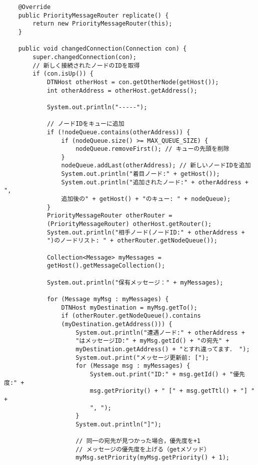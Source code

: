 \documentclass[11pt]{icsthesis}
\begin{document}
\begin{framed}
\begin{verbatim}
    @Override
    public PriorityMessageRouter replicate() {
        return new PriorityMessageRouter(this);
    }

    public void changedConnection(Connection con) {
        super.changedConnection(con);
        // 新しく接続されたノードのIDを取得
        if (con.isUp()) {
            DTNHost otherHost = con.getOtherNode(getHost());
            int otherAddress = otherHost.getAddress();
            
            System.out.println("-----");
            
            // ノードIDをキューに追加
            if (!nodeQueue.contains(otherAddress)) {
                if (nodeQueue.size() >= MAX_QUEUE_SIZE) {
                    nodeQueue.removeFirst(); // キューの先頭を削除
                }
                nodeQueue.addLast(otherAddress); // 新しいノードIDを追加
                System.out.println("着目ノード:" + getHost());
                System.out.println("追加されたノード:" + otherAddress + ", 
                追加後の" + getHost() + "のキュー: " + nodeQueue);
            }
            PriorityMessageRouter otherRouter = 
            (PriorityMessageRouter) otherHost.getRouter();
            System.out.println("相手ノード(ノードID:" + otherAddress + 
            ")のノードリスト: " + otherRouter.getNodeQueue());
      
            Collection<Message> myMessages = 
            getHost().getMessageCollection();
            
            System.out.println("保有メッセージ：" + myMessages);

            for (Message myMsg : myMessages) {
                DTNHost myDestination = myMsg.getTo();
                if (otherRouter.getNodeQueue().contains
                (myDestination.getAddress())) {
                    System.out.println("遭遇ノード:" + otherAddress + 
                    "はメッセージID:" + myMsg.getId() + "の宛先" + 
                    myDestination.getAddress() + "とすれ違ってます． ");
                    System.out.print("メッセージ更新前: [");
                    for (Message msg : myMessages) {
                        System.out.print("ID:" + msg.getId() + "優先度:" + 
                        msg.getPriority() + " [" + msg.getTtl() + "] " + 
                        ", ");
                    }
                    System.out.println("]");

                    // 同一の宛先が見つかった場合，優先度を+1
                    // メッセージの優先度を上げる（getメソッド）
                    myMsg.setPriority(myMsg.getPriority() + 1);
                    

\end{verbatim}
\end{framed}
\end{document}
